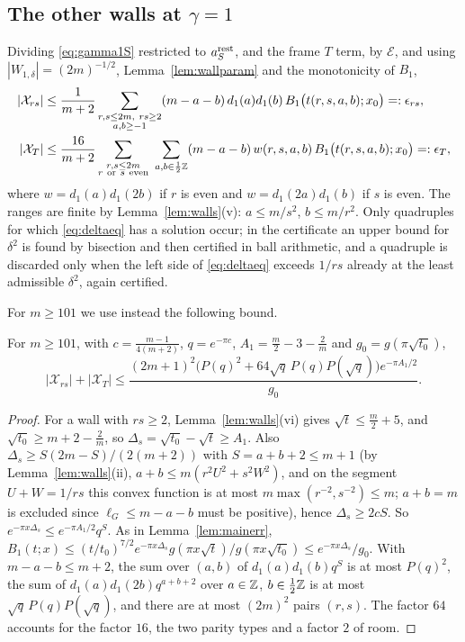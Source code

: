 \subsection{The other walls at \texorpdfstring{$\gamma=1$}{gamma=1}}
Dividing \eqref{eq:gamma1S} restricted to $a_S^{\rm rest}$, and the frame $T$ term, by $\mathcal E$, and using $|W_{1,\delta}|=(2m)^{-1/2}$, Lemma~\ref{lem:wallparam} and the monotonicity of $B_1$,
\begin{align}
|\mathcal X_{rs}|&\le\frac1{m+2}\sum_{\substack{r,s\le2m,\ rs\ge2\\ a,b\ge-1}}(m-a-b)\,d_1(a)d_1(b)\,B_1\big(t(r,s,a,b);x_0\big)=:\epsilon_{rs},\label{eq:Xrs}\\
|\mathcal X_T|&\le\frac{16}{m+2}\sum_{\substack{r,s\le2m\\ r\ \text{or}\ s\ \text{even}}}\ \sum_{a,b\in\frac12\ZZ}(m-a-b)\,w(r,s,a,b)\,B_1\big(t(r,s,a,b);x_0\big)=:\epsilon_T,\label{eq:XT}
\end{align}
where $w=d_1(a)d_1(2b)$ if $r$ is even and $w=d_1(2a)d_1(b)$ if $s$ is even. The ranges are finite by Lemma~\ref{lem:walls}(v): $a\le m/s^2$, $b\le m/r^2$. Only quadruples for which \eqref{eq:deltaeq} has a solution occur; in the certificate an upper bound for $\delta^2$ is found by bisection and then certified in ball arithmetic, and a quadruple is discarded only when the left side of \eqref{eq:deltaeq} exceeds $1/rs$ already at the least admissible $\delta^2$, again certified.

For $m\ge101$ we use instead the following bound.

\begin{lemma}\label{lem:rsbig}
For $m\ge101$, with $c=\frac{m-1}{4(m+2)}$, $q=e^{-\pi c}$, $A_1=\frac m2-3-\frac2m$ and $g_0=g(\pi\sqrt{t_0})$,
\[
|\mathcal X_{rs}|+|\mathcal X_T|\le\frac{(2m+1)^2\big(P(q)^2+64\sqrt q\,P(q)P(\sqrt q)\big)e^{-\pi A_1/2}}{g_0}.
\]
\end{lemma}

\begin{proof}
For a wall with $rs\ge2$, Lemma~\ref{lem:walls}(vi) gives $\sqrt t\le\frac m2+5$, and $\sqrt{t_0}\ge m+2-\frac2m$, so $\Delta_s=\sqrt{t_0}-\sqrt t\ge A_1$. Also $\Delta_s\ge S(2m-S)/(2(m+2))$ with $S=a+b+2\le m+1$ (by Lemma~\ref{lem:walls}(ii), $a+b\le m(r^2U^2+s^2W^2)$, and on the segment $U+W=1/rs$ this convex function is at most $m\max(r^{-2},s^{-2})\le m$; $a+b=m$ is excluded since $\ell_G\le m-a-b$ must be positive), hence $\Delta_s\ge2cS$. So $e^{-\pi x\Delta_s}\le e^{-\pi A_1/2}q^S$. As in Lemma~\ref{lem:mainerr}, $B_1(t;x)\le(t/t_0)^{7/2}e^{-\pi x\Delta_s}g(\pi x\sqrt t)/g(\pi x\sqrt{t_0})\le e^{-\pi x\Delta_s}/g_0$. With $m-a-b\le m+2$, the sum over $(a,b)$ of $d_1(a)d_1(b)q^S$ is at most $P(q)^2$, the sum of $d_1(a)d_1(2b)q^{a+b+2}$ over $a\in\mathbb{Z}$, $b\in\frac12\mathbb{Z}$ is at most $\sqrt q\,P(q)P(\sqrt q)$, and there are at most $(2m)^2$ pairs $(r,s)$. The factor $64$ accounts for the factor $16$, the two parity types and a factor $2$ of room.
\end{proof}

